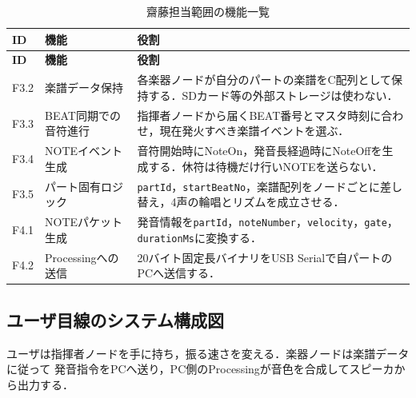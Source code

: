 \documentclass[uplatex,dvipdfmx]{jlreq}
\newcommand{\code}[1]{\texttt{#1}}
\begin{document}
\begin{longtable}{p{}p{}p{}}
\caption{齋藤担当範囲の機能一覧}\label{tab:functions}\\
\toprule
\textbf{ID} & \textbf{機能} & \textbf{役割} \\
\midrule
\endfirsthead
\toprule
\textbf{ID} & \textbf{機能} & \textbf{役割} \\
\midrule
\endhead
F3.2 & 楽譜データ保持 &
各楽器ノードが自分のパートの楽譜をC配列として保持する．SDカード等の外部ストレージは使わない．\\
F3.3 & BEAT同期での音符進行 &
指揮者ノードから届くBEAT番号とマスタ時刻に合わせ，現在発火すべき楽譜イベントを選ぶ．\\
F3.4 & NOTEイベント生成 &
音符開始時にNoteOn，発音長経過時にNoteOffを生成する．休符は待機だけ行いNOTEを送らない．\\
F3.5 & パート固有ロジック &
\code{partId}，\code{startBeatNo}，楽譜配列をノードごとに差し替え，4声の輪唱とリズムを成立させる．\\
F4.1 & NOTEパケット生成 &
発音情報を\code{partId}，\code{noteNumber}，\code{velocity}，\code{gate}，
\code{durationMs}に変換する．\\
F4.2 & Processingへの送信 &
20バイト固定長バイナリをUSB Serialで自パートのPCへ送信する．\\
\bottomrule
\end{longtable}

\subsection{ユーザ目線のシステム構成図}

ユーザは指揮者ノードを手に持ち，振る速さを変える．楽器ノードは楽譜データに従って
発音指令をPCへ送り，PC側のProcessingが音色を合成してスピーカから出力する．
\end{document}
